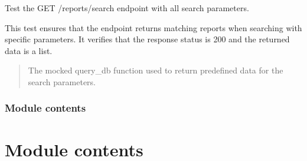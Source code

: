 \documentclass[letterpaper,10pt,english]{sphinxmanual}
\begin{document}

\begin{fulllineitems}
\label{\detokenize{test.my_fastapi:test.my_fastapi.test_main.test_search_reports_all_params}}
\pysigstartsignatures
\pysiglinewithargsret
{}
{}
{}
\pysigstopsignatures
\sphinxAtStartPar
Test the GET /reports/search endpoint with all search parameters.

\sphinxAtStartPar
This test ensures that the endpoint returns matching reports when searching with specific parameters.
It verifies that the response status is 200 and the returned data is a list.
\begin{quote}\begin{description}
\sphinxAtStartPar
{} \textendash{} The mocked query\_db function used to return predefined data for the search parameters.

\end{description}\end{quote}

\end{fulllineitems}



\subsubsection{Module contents}
\label{\detokenize{test.my_fastapi:module-test.my_fastapi}}\label{\detokenize{test.my_fastapi:module-contents}}

\section{Module contents}
\label{\detokenize{test:module-test}}\label{\detokenize{test:module-contents}}
\end{document}
